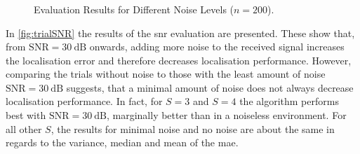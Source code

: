 \subsubsection*{}
\begin{figure}[!ht]
\iftoggle{quick}{%
    \texttt{[image: plots/boxplots/boxplot-joined-SNR]}
}{%
    
}
	\caption[Evaluation Results for Different Noise Levels]{Evaluation Results for Different Noise Levels ($n=200$).}
	\label{fig:trialSNR}
\end{figure}

In \autoref{fig:trialSNR} the results of the \gls{snr} evaluation are presented. These show that, from ${\text{SNR}=30~\text{dB}}$ onwards, adding more noise to the received signal increases the localisation error and therefore decreases localisation performance. However, comparing the trials without noise to those with the least amount of noise ${\text{SNR}=30~\text{dB}}$ suggests, that a minimal amount of noise does not always decrease localisation performance. In fact, for $S=3$ and $S=4$ the algorithm performs best with ${\text{SNR}=30~\text{dB}}$, marginally better than in a noiseless environment. For all other $S$, the results for minimal noise and no noise are about the same in regards to the variance, median and mean of the \gls{mae}.